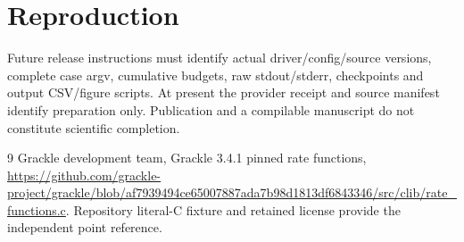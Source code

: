 \documentclass[11pt]{article}
\begin{document}
\section{Reproduction}
Future release instructions must identify actual driver/config/source versions, complete case argv, cumulative budgets, raw stdout/stderr, checkpoints and output CSV/figure scripts. At present the provider receipt and source manifest identify preparation only. Publication and a compilable manuscript do not constitute scientific completion.
\begin{thebibliography}{9}
 Grackle development team, Grackle 3.4.1 pinned rate functions, \url{https://github.com/grackle-project/grackle/blob/af7939494ce65007887ada7b98d1813df6843346/src/clib/rate_functions.c}. Repository literal-C fixture and retained license provide the independent point reference.
\end{thebibliography}
\end{document}
